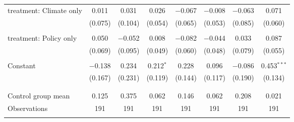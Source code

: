 \begin{tabular}{@{\extracolsep{5pt}}lccccccc}
 treatment: Climate only & 0.011 & 0.031 & 0.026 & $-$0.067 & $-$0.008 & $-$0.063 & 0.071 \\ 
  & (0.075) & (0.104) & (0.054) & (0.065) & (0.053) & (0.085) & (0.060) \\ 
  & & & & & & & \\ 
 treatment: Policy only & 0.050 & $-$0.052 & 0.008 & $-$0.082 & $-$0.044 & 0.033 & 0.087 \\ 
  & (0.069) & (0.095) & (0.049) & (0.060) & (0.048) & (0.079) & (0.055) \\ 
  & & & & & & & \\ 
 Constant & $-$0.138 & 0.234 & 0.212$^{*}$ & 0.228 & 0.096 & $-$0.086 & 0.453$^{***}$ \\ 
  & (0.167) & (0.231) & (0.119) & (0.144) & (0.117) & (0.190) & (0.134) \\ 
  & & & & & & & \\ 
\hline \\[-1.8ex] 
Control group mean & 0.125 & 0.375 & 0.062 & 0.146 & 0.062 & 0.208 & 0.021 \\ 
Observations & 191 & 191 & 191 & 191 & 191 & 191 & 191 \\ 
\hline 
\hline \\[-1.8ex] 
\end{tabular} 
